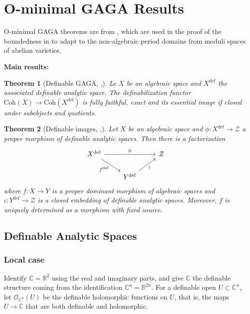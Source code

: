 \documentclass{amsart}
\newtheorem{theorem}{Theorem}[section]
\theoremstyle{definition}
\numberwithin{equation}{section}
\newcommand{\definable}{\mathrm{def}}
\begin{document}
\section{O-minimal GAGA Results}
O-minimal GAGA theorems are from \cite{zbMATH07662555},
which are used in the proof of the boundedness in \cite{arXiv:2507.00973,arXiv:2508.19215}
to adapt to the non-algebraic period domains from moduli spaces of abelian varieties.

{\noindent\Large\bfseries Main results:}

\begin{theorem}[{Definable GAGA, \cite[Theorem 2.1]{arXiv:2508.19215},\cite[Theorem 1.4]{zbMATH07662555}}]
    Le $X$ be an algebraic space and $X^{\definable}$ the associated definable analytic space.
    The definabilization functor $\mathrm{Coh}(X) \to \mathrm{Coh}(X^{\definable})$ is fully faithful, exact and 
    its essential image if closed under subobjects and quotients.
\end{theorem}

\begin{theorem}[{Definable images, \cite[Theorem 2.2]{arXiv:2508.19215},\cite[Theorem 1.3]{zbMATH07662555}}]
    \label{def image}
    Let $X$ be an algebraic space and 
    $\phi: X^{\definable} \to \mathcal{Z}$ a proper morphism of definable analytic spaces.
    Then there is a factorization
    \[\begin{tikzcd}
    X^{\definable}\ar[rr,"\phi"]\ar[dr,"f^{\definable}"'] & & \mathcal{Z} \\
    & Y^{\definable}\ar[ur,"\iota"'] &
    \end{tikzcd}\]
    where $f: X\to Y$ is a proper dominant morphism of algebraic spaces and 
    $\iota: Y^{\definable} \to \mathcal{Z}$ is a closed embedding of definable analytic spaces.
    Moreover, $f$ is uniquely determined as a morphism with fixed source.
\end{theorem}

\subsection{Definable Analytic Spaces}
\subsubsection{Local case}
Identify $\mathbb{C} = \mathbb{R}^2$ using the real and imaginary parts,
and give $\mathbb{C}$ the definable structure coming from the identification $\mathbb{C}^n = \mathbb{R}^{2n}$.
For a definable open $U \subset \mathbb{C}^n$,
let $\mathcal{O}_{\mathbb{C}^n}(U)$ be the definable holomorphic functions on $U$,
that is, the maps $U \to \mathbb{C}$ that are both definable and holomorphic.
\end{document}
